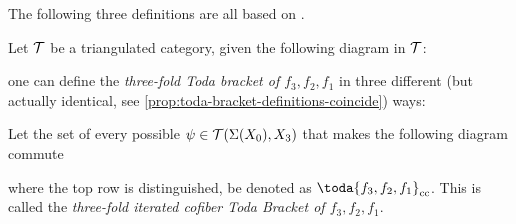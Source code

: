 The following three definitions are all based on \cite[Definition 3.1]{Christensen-Frankland_2017}.

Let \( {\mathcal{T}} \) be a triangulated category, given the following diagram in \( {\mathcal{T}} \):
\begin{center}
\end{center}

one can define the \emph{three-fold Toda bracket of \( f_3, f_2, f_1 \)} in three different (but actually identical, see \autoref{prop:toda-bracket-definitions-coincide}) ways:

\begin{definition}
    \label{def:iterated-cofiber-toda-bracket}
    Let the set of every possible \( \psi \in {\mathcal{T}}(\Sigma(X_0), X_3) \) that makes the following diagram commute
    \begin{center}
    \end{center}
    where the top row is distinguished, be denoted as \( \toda{f_3, f_2, f_1}_{\cc} \). This is called the \emph{three-fold iterated cofiber Toda Bracket of \( f_3, f_2, f_1 \)}.
\end{definition}

